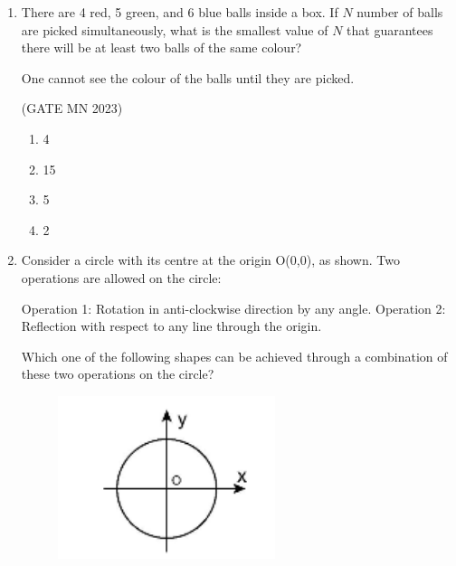 \documentclass[journal]{IEEEtran}
\begin{document}
\begin{enumerate}
\begin{multicols}{4}
\begin{enumerate}
    \item 2
    \item 9
    \item 3
    \item 6
\end{enumerate}
\end{multicols}

\item There are 4 red, 5 green, and 6 blue balls inside a box. If $N$ number of balls are picked simultaneously, what is the smallest value of $N$ that guarantees there will be at least two balls of the same colour?  

One cannot see the colour of the balls until they are picked.  

\hfill(GATE MN 2023)

\begin{multicols}{4}
\begin{enumerate}
    \item 4
    \item 15
    \item 5
    \item 2
\end{enumerate}
\end{multicols}
\item Consider a circle with its centre at the origin O(0,0), as shown. Two operations are allowed on the circle:  

Operation 1: Rotation in anti-clockwise direction by any angle.  
Operation 2: Reflection with respect to any line through the origin.  

Which one of the following shapes can be achieved through a combination of these two operations on the circle?  
\begin{figure}[H]
    \centering
\includegraphics[width=0.6\textwidth]{Screenshot_2025_0822_110011.png}
\caption{}
    \label{fig:Q5}
\end{figure}



\end{enumerate}
\end{document}
